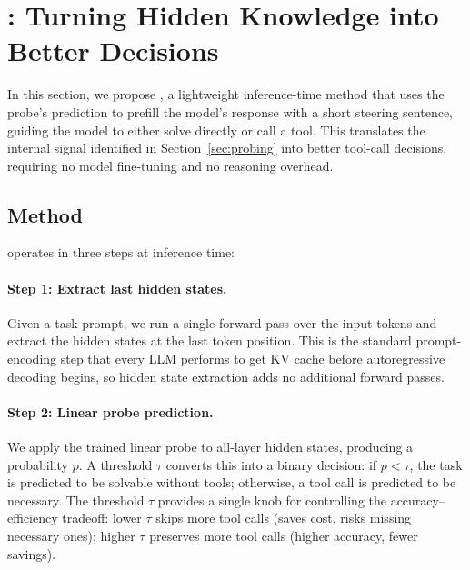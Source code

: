 \section{\method{}: Turning Hidden Knowledge into Better Decisions}
\label{sec:method}

In this section, we propose \method{}, a lightweight inference-time method that uses the probe's prediction to prefill the model's response with a short steering sentence, guiding the model to either solve directly or call a tool. This translates the internal signal identified in Section~\ref{sec:probing} into better tool-call decisions, requiring no model fine-tuning and no reasoning overhead.

\subsection{Method}

\method{} operates in three steps at inference time:

\paragraph{Step 1: Extract last hidden states.}
Given a task prompt, we run a single forward pass over the input tokens and extract the hidden states at the last token position. This is the standard prompt-encoding step that every LLM performs to get KV cache before autoregressive decoding begins, so hidden state extraction adds no additional forward passes.
\vspace{-5pt}
\paragraph{Step 2: Linear probe prediction.}
We apply the trained linear probe to all-layer hidden states, producing a probability $p$. A threshold $\tau$ converts this into a binary decision: if $p < \tau$, the task is predicted to be solvable without tools; otherwise, a tool call is predicted to be necessary. The threshold $\tau$ provides a single knob for controlling the accuracy--efficiency tradeoff: lower $\tau$ skips more tool calls (saves cost, risks missing necessary ones); higher $\tau$ preserves more tool calls (higher accuracy, fewer savings).
\vspace{-5pt}
